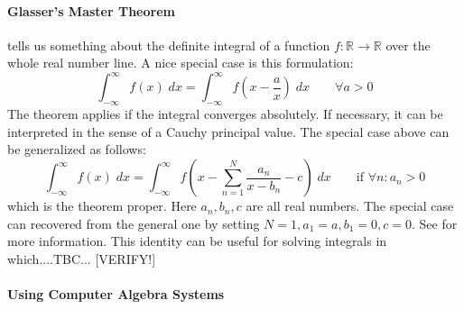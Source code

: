 \paragraph{Glasser's Master Theorem} tells us something about the definite integral of a function $f: \mathbb{R} \rightarrow \mathbb{R}$ over the whole real number line. A nice special case is this formulation:
\begin{equation}
 \int_{-\infty}^{\infty} f(x) \; dx  = 
 \int_{-\infty}^{\infty} f(x - \frac{a}{x}) \; dx 
 \qquad \forall a > 0
\end{equation}
The theorem applies if the integral converges absolutely. If necessary, it can be interpreted in the sense of a Cauchy principal value. The special case above can be generalized as follows:
\begin{equation}
 \int_{-\infty}^{\infty} f(x) \; dx  = 
 \int_{-\infty}^{\infty} f \left( x - \sum_{n=1}^N \frac{a_n}{x - b_n} - c \right) \; dx 
 \qquad \text{if } \forall n: a_n > 0
\end{equation}
which is the theorem proper. Here $a_n, b_n, c$ are all real numbers. The special case can recovered from the general one by setting $N=1, a_1=a, b_1=0, c=0$. See \cite{WK_GlasserMaster} for more information. This identity can be useful for solving integrals in which....TBC...
[VERIFY!]














\paragraph{Using Computer Algebra Systems}

